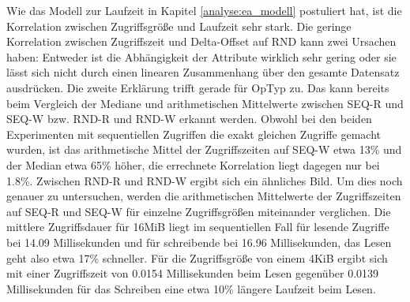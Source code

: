 \documentclass[
	12pt,
	a4paper,
	BCOR10mm,
	DIV14,
	listof=totoc,
	bibliography=totoc,
	headsepline
]{scrreprt}
\begin{document}
Wie das Modell zur Laufzeit in Kapitel \ref{analyse:ea_modell} postuliert hat, ist die Korrelation zwischen Zugriffsgröße und Laufzeit sehr stark.
Die geringe Korrelation zwischen Zugriffszeit und Delta-Offset auf RND kann zwei Ursachen haben: Entweder ist die Abhängigkeit der Attribute wirklich sehr gering oder sie lässt sich nicht durch einen linearen Zusammenhang über den gesamte Datensatz ausdrücken. 
Die zweite Erklärung trifft gerade für OpTyp zu. 
Das kann bereits beim Vergleich der Mediane und arithmetischen Mittelwerte zwischen SEQ-R und SEQ-W bzw. RND-R und RND-W erkannt werden.
Obwohl bei den beiden Experimenten mit sequentiellen Zugriffen die exakt gleichen Zugriffe gemacht wurden, ist das arithmetische Mittel der Zugriffszeiten auf SEQ-W etwa 13\% und der Median etwa 65\% höher, die errechnete Korrelation liegt dagegen nur bei 1.8\%. Zwischen RND-R und RND-W ergibt sich ein ähnliches Bild.
Um dies noch genauer zu untersuchen, werden die arithmetischen Mittelwerte der Zugriffszeiten auf SEQ-R und SEQ-W für einzelne Zugriffsgrößen miteinander verglichen.
Die mittlere Zugriffsdauer für 16MiB liegt im sequentiellen Fall für lesende Zugriffe bei 14.09 Millisekunden und für schreibende bei 16.96 Millisekunden, das Lesen geht also etwa 17\% schneller.
Für die Zugriffsgröße von einem 4KiB ergibt sich mit einer Zugriffszeit von 0.0154 Millisekunden beim Lesen gegenüber 0.0139 Millisekunden für das Schreiben eine etwa 10\% längere Laufzeit beim Lesen.

\begin{table}
	\centering
	\scriptsize
\end{table}
\end{document}
